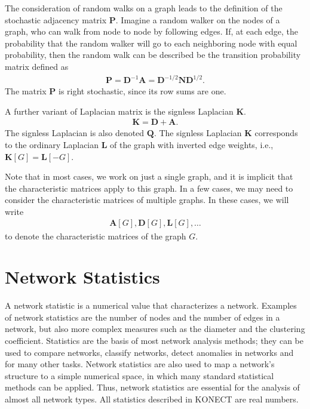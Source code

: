 \documentclass{article}
\begin{document}
The consideration of random walks on a graph leads to the definition of
the stochastic adjacency matrix $\mathbf P$.  Imagine a random walker on
the nodes of a graph, who can walk from node to node by following
edges.  If, at each edge, the probability that the random walker will go
to each neighboring node with equal probability, then the random walk
can be described be the transition probability matrix defined as
\begin{align}
  \mathbf P = \mathbf D^{-1} \mathbf A = \mathbf D^{-1/2} \mathbf N
  \mathbf D^{1/2}.
\end{align}
The matrix $\mathbf P$ is right stochastic, since its row sums are one. 

A further variant of Laplacian matrix is the signless Laplacian $\mathbf
K$. 
\begin{align}
  \mathbf K = \mathbf D + \mathbf A. 
\end{align}
The signless Laplacian is also denoted $\mathbf Q$. 
The signless Laplacian $\mathbf K$ corresponds to the ordinary Laplacian
$\mathbf L$ of the graph with inverted edge weights, i.e., $\mathbf K[G] =
\mathbf L[-G]$. 

Note that in most cases, we work on just a single graph, and it is
implicit that the characteristic matrices apply to this graph.  In a few
cases, we may need to consider the characteristic matrices of multiple
graphs.  In these cases, we will write
\begin{align*}
  \mathbf A[G], \mathbf D[G], \mathbf L[G], \dotsc
\end{align*}
to denote the characteristic matrices of the graph $G$. 

\section{Network Statistics}
\label{sec:statistics}
A network statistic is a numerical value that characterizes a network.
Examples of network statistics are the number of nodes and the number of
edges in a network, but also more complex measures such as the diameter and the
clustering coefficient.  
Statistics are the basis of most network analysis methods; they can be
used to compare networks, classify networks, detect anomalies in
networks and for many other tasks.  Network statistics are also used to map a network's structure
to a simple numerical space, in which many standard statistical
methods can be applied.  Thus, network statistics are essential for the
analysis of almost all network types. 
All statistics described in KONECT are real numbers.  
\end{document}
